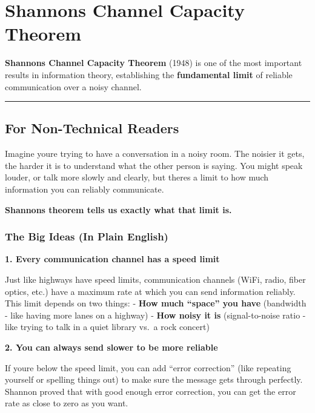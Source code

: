 \section{Shannon\textquotesingle s Channel Capacity
Theorem}\label{shannons-channel-capacity-theorem}

\textbf{Shannon\textquotesingle s Channel Capacity Theorem} (1948) is
one of the most important results in information theory, establishing
the \textbf{fundamental limit} of reliable communication over a noisy
channel.

\begin{center}\rule{0.5\linewidth}{0.5pt}\end{center}

\subsection{\texorpdfstring{ For Non-Technical
Readers}{ For Non-Technical Readers}}\label{for-non-technical-readers}

Imagine you\textquotesingle re trying to have a conversation in a noisy
room. The noisier it gets, the harder it is to understand what the other
person is saying. You might speak louder, or talk more slowly and
clearly, but there\textquotesingle s a limit to how much information you
can reliably communicate.

\textbf{Shannon\textquotesingle s theorem tells us exactly what that
limit is.}

\subsubsection{The Big Ideas (In Plain
English)}\label{the-big-ideas-in-plain-english}

\textbf{1. Every communication channel has a speed limit}

Just like highways have speed limits, communication channels (WiFi,
radio, fiber optics, etc.) have a maximum rate at which you can send
information reliably. This limit depends on two things: - \textbf{How
much ``space'' you have} (bandwidth - like having more lanes on a
highway) - \textbf{How noisy it is} (signal-to-noise ratio - like trying
to talk in a quiet library vs.~a rock concert)

\textbf{2. You can always send slower to be more reliable}

If you\textquotesingle re below the speed limit, you can add ``error
correction'' (like repeating yourself or spelling things out) to make
sure the message gets through perfectly. Shannon proved that with good
enough error correction, you can get the error rate as close to zero as
you want.

